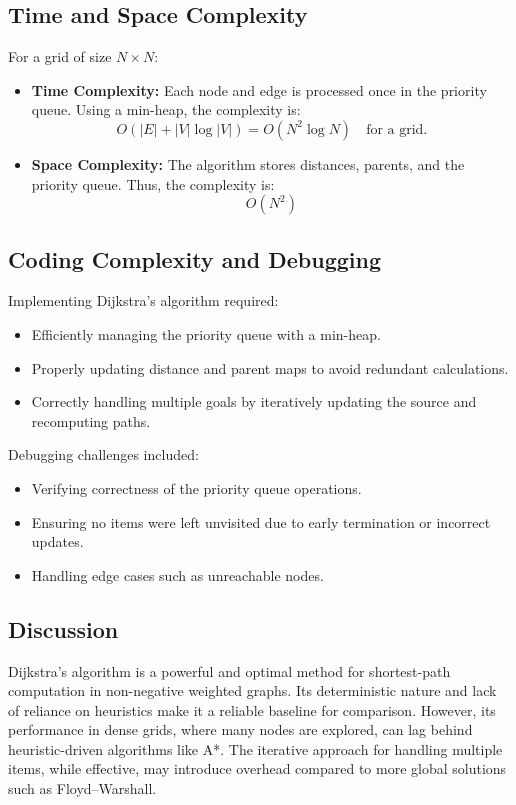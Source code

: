 \documentclass[12pt]{article}
\begin{document}
\subsection{Time and Space Complexity}
For a grid of size \( N \times N \):
\begin{itemize}
    \item \textbf{Time Complexity:} Each node and edge is processed once in the priority queue. Using a min-heap, the complexity is:
    \[
    O(|E| + |V| \log |V|) = O(N^2 \log N) \quad \text{for a grid.}
    \]
    \item \textbf{Space Complexity:} The algorithm stores distances, parents, and the priority queue. Thus, the complexity is:
    \[
    O(N^2)
    \]
\end{itemize}


\subsection{Coding Complexity and Debugging}
Implementing Dijkstra's algorithm required:
\begin{itemize}
    \item Efficiently managing the priority queue with a min-heap.
    \item Properly updating distance and parent maps to avoid redundant calculations.
    \item Correctly handling multiple goals by iteratively updating the source and recomputing paths.
\end{itemize}

\noindent Debugging challenges included:
\begin{itemize}
    \item Verifying correctness of the priority queue operations.
    \item Ensuring no items were left unvisited due to early termination or incorrect updates.
    \item Handling edge cases such as unreachable nodes.
\end{itemize}

\subsection{Discussion}
Dijkstra's algorithm is a powerful and optimal method for shortest-path computation in non-negative weighted graphs. Its deterministic nature and lack of reliance on heuristics make it a reliable baseline for comparison. However, its performance in dense grids, where many nodes are explored, can lag behind heuristic-driven algorithms like A*. The iterative approach for handling multiple items, while effective, may introduce overhead compared to more global solutions such as Floyd–Warshall.
\newpage
\end{document}
